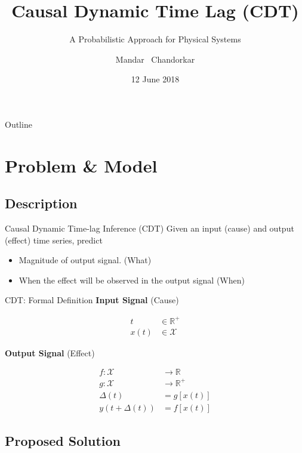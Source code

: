 \documentclass{beamer}
\title{Causal Dynamic Time Lag (CDT)}
\subtitle{A Probabilistic Approach for Physical Systems}
\author{Mandar ~Chandorkar}
\institute[CWI \& INRIA] %
{
  \inst{1}%
  Multiscale Dynamics\\
  CWI, Amsterdam
  \and
  \inst{2}%
  TAO Research Unit\\
  INRIA, CNRS, Saclay}
\date{12 June 2018}
\begin{document}
\begin{frame}
  \titlepage
\end{frame}

\begin{frame}{Outline}
  \tableofcontents
\end{frame}

\section{Problem \& Model}

\subsection{Description}

\begin{frame}{Causal Dynamic Time-lag Inference (CDT)}
  Given an input (cause) and output (effect) time series, predict 
  \begin{itemize}
  \item {
      Magnitude of output signal. (What)
  }
  \item {
      When the effect will be observed in the output signal (When)
  }
  \end{itemize}
\end{frame}

\begin{frame}{CDT: Formal Definition}
\textbf{Input Signal} (Cause)

\begin{align*}
t &\in \mathbb{R}^+\\
x(t) &\in \mathcal{X}
\end{align*}

\textbf{Output Signal} (Effect)

\begin{align*}
f: \mathcal{X} &\rightarrow \mathbb{R}\\
g: \mathcal{X} &\rightarrow \mathbb{R}^+\\
\Delta(t) &= g[x(t)] \\
y(t + \Delta(t)) &= f[x(t)] 
\end{align*}

\end{frame}

\subsection{Proposed Solution}
\end{document}
